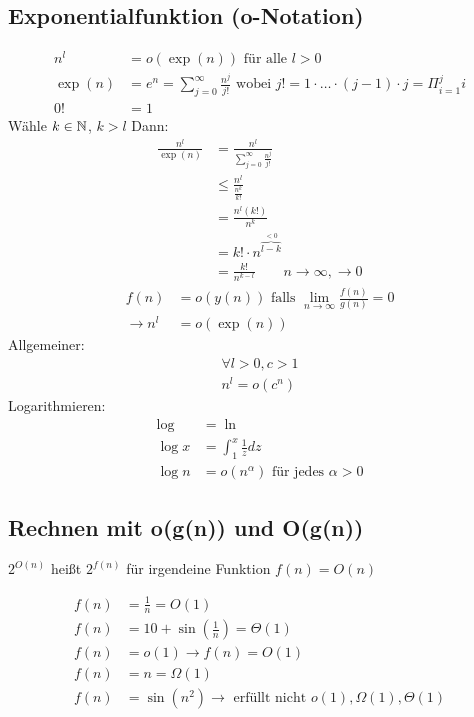 \subsection{Exponentialfunktion (o-Notation)}
\begin{align*}
    n^l &= o(\exp(n)) \text{ für alle } l > 0\\
    \exp(n) &= e^n = \sum_{j = 0}^{\infty} \frac{n^j}{j!} \text{ wobei } j! = 1 \cdot \dots \cdot (j-1) \cdot j = \Pi_{i = 1}^j i\\
    0! &= 1
\end{align*} 
Wähle $k \in \mathbb N$, $k > l$ Dann:
\begin{align*}
    \frac{n^l}{\exp(n)} &= \frac{n^l}{\sum_{j = 0}^{\infty} \frac{n^j}{j!}}\\
    &\leq \frac{n^l}{\frac{n^k}{k!}}\\
    &= \frac{n^l(k!)}{n^k}\\
    &= k! \cdot n^{\overbrace{l - k}^{< 0}}\\
    &= \frac{k!}{n^{k - l}} \hspace{2em} n \rightarrow \infty, \rightarrow 0
\end{align*}
\begin{align*}
    f(n) &= o(y(n)) \text{ falls } \lim_{n \rightarrow \infty} \frac{f(n)}{g(n)} = 0\\
    \rightarrow n^l &= o(\exp(n))
\end{align*}
Allgemeiner:
\begin{align*}
    \forall l > 0, c > 1\\
    n^l = o(c^n)
\end{align*}
Logarithmieren:
\begin{align*}
    \log &= \ln\\
    \log x &= \int_{1}^x \frac{1}{z} dz\\
    \log n &= o(n^\alpha) \text{ für jedes } \alpha > 0
\end{align*}




\subsection{Rechnen mit o(g(n)) und O(g(n))}
$2^{O(n)}$ heißt $2^{f(n)}$ für irgendeine Funktion $f(n) = O(n)$

\begin{align*}
    f(n) &= \frac{1}{n} = O(1)\\
    f(n) &= 10 + \sin(\frac{1}{n}) = \Theta(1)\\
    f(n) &= o(1) \rightarrow f(n) = O(1)\\
    f(n) &= n = \Omega(1)\\
    f(n) &= \sin(n^2) \rightarrow \text{ erfüllt nicht } o(1), \Omega(1), \Theta(1)
\end{align*}

